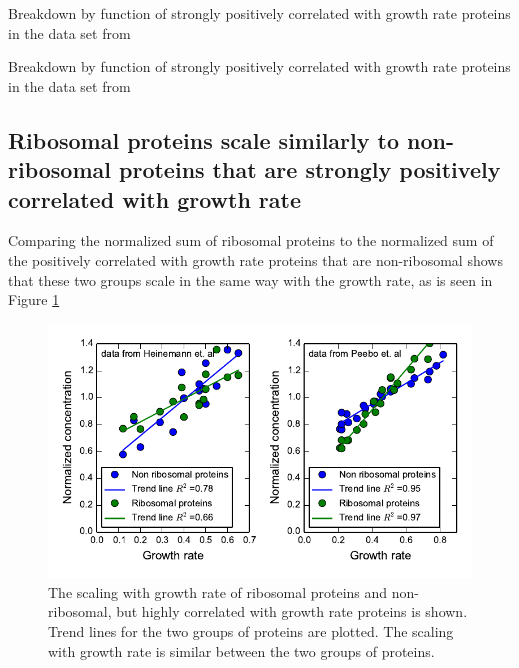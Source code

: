 \documentclass[a4paper]{article}
\begin{document}
\begin{table}[H]
\centering
\caption{\label{tab:corrbreakdownh}
Breakdown by function of strongly positively correlated with growth rate proteins in the data set from \cite{Heinemann2015} }
\end{table}

\begin{table}[H]
\centering
\caption{\label{tab:corrbreakdownv}
Breakdown by function of strongly positively correlated with growth rate proteins in the data set from \cite{Peebo_2015} }
\end{table}

\subsection{Ribosomal proteins scale similarly to non-ribosomal proteins that are strongly positively correlated with growth rate}
Comparing the normalized sum of ribosomal proteins to the normalized sum of the positively correlated with growth rate proteins that are non-ribosomal shows that these two groups scale in the same way with the growth rate, as is seen in Figure \ref{fig:ribsnonribs}


\begin{figure}[H]
\begin{center}
\includegraphics[width=1\columnwidth]{RibsVsGlob.pdf}
\caption{\label{fig:ribsnonribs}
  The scaling with growth rate of ribosomal proteins and non-ribosomal, but highly correlated with growth rate proteins is shown.
Trend lines for the two groups of proteins are plotted.
The scaling with growth rate is similar between the two groups of proteins.
%
}
\end{center}
\end{figure}
\end{document}
